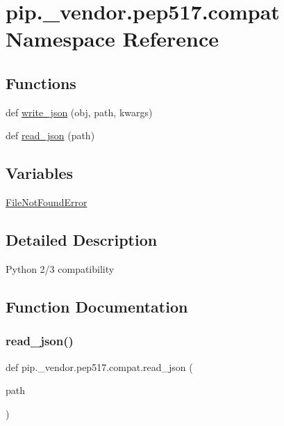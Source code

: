 \hypertarget{namespacepip_1_1__vendor_1_1pep517_1_1compat}{}\section{pip.\+\_\+vendor.\+pep517.\+compat Namespace Reference}
\label{namespacepip_1_1__vendor_1_1pep517_1_1compat}
\subsection*{Functions}
\begin{DoxyCompactItemize}
\item 
def \hyperlink{namespacepip_1_1__vendor_1_1pep517_1_1compat_abac1fc8b7a5ef66021d3686c98f62b4a}{write\+\_\+json} (obj, path, kwargs)
\item 
def \hyperlink{namespacepip_1_1__vendor_1_1pep517_1_1compat_a3a39967e365ef8e82e9920b3b4077d2b}{read\+\_\+json} (path)
\end{DoxyCompactItemize}
\subsection*{Variables}
\begin{DoxyCompactItemize}
\item 
\hyperlink{namespacepip_1_1__vendor_1_1pep517_1_1compat_a3d60ffd76f56c6dba6e918ff84910319}{File\+Not\+Found\+Error}
\end{DoxyCompactItemize}


\subsection{Detailed Description}
\begin{DoxyVerb}Python 2/3 compatibility\end{DoxyVerb}
 

\subsection{Function Documentation}
\mbox{\label{namespacepip_1_1__vendor_1_1pep517_1_1compat_a3a39967e365ef8e82e9920b3b4077d2b}} 
\subsubsection{\texorpdfstring{read\+\_\+json()}{read\_json()}}
{\footnotesize\ttfamily def pip.\+\_\+vendor.\+pep517.\+compat.\+read\+\_\+json (\begin{DoxyParamCaption}\item[{}]{path }\end{DoxyParamCaption})}

